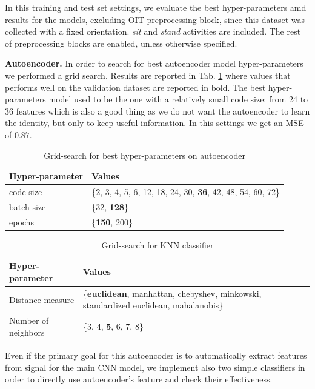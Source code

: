 In this training and test set settings, we evaluate the best
hyper-parameters amd results for the models, excluding OIT
preprocessing block, since this dataset was collected with a fixed orientation. \textit{sit} and \textit{stand} activities are included. The rest
of preprocessing blocks are enabled, unless otherwise specified.

\textbf{Autoencoder.} In order to search for best autoencoder model
hyper-parameters we performed a grid search. Results are reported in
Tab. \ref{tab:ae-hyperparams} where values that performs well on the
validation dataset are reported in bold. The best hyper-parameters
model used to be the one with a relatively small code size: from 24 to
36 features which is also a good thing as we do not want the
autoencoder to learn the identity, but only to keep useful
information. In this settings we get an MSE of $0.87$.

\begin{table}[t]
  \centering
  \begin{tabular}{lp{4cm}}
    \hline
    Hyper-parameter & Values \\
    \hline
    code size & \{2, 3, 4, 5, 6, 12, 18, 24, 30, \textbf{36}, 42, 48, 54, 60, 72\} \\
    batch size & \{32, \textbf{128}\} \\
    epochs & \{\textbf{150}, 200\} \\
    \hline
  \end{tabular}
  \caption{Grid-search for best hyper-parameters on autoencoder}
  \label{tab:ae-hyperparams}
\end{table}

\begin{table}[b]
	\centering
	\begin{tabular}{p{2.4cm}p{4.5cm}}
		\hline
		Hyper-parameter & Values \\
		\hline
		Distance measure & \{\textbf{euclidean}, manhattan, chebyshev, minkowski, standardized euclidean, mahalanobis\} \\
		Number of neighbors & \{3, 4, \textbf{5}, 6, 7, 8\} \\
		\hline
	\end{tabular}
	\caption{Grid-search for KNN classifier}
	\label{tab:knn-grid-search}
\end{table}

Even if the primary goal for this autoencoder is to automatically
extract features from signal for the main CNN model, we implement also
two simple classifiers in order to directly use autoencoder's feature
and check their effectiveness.

